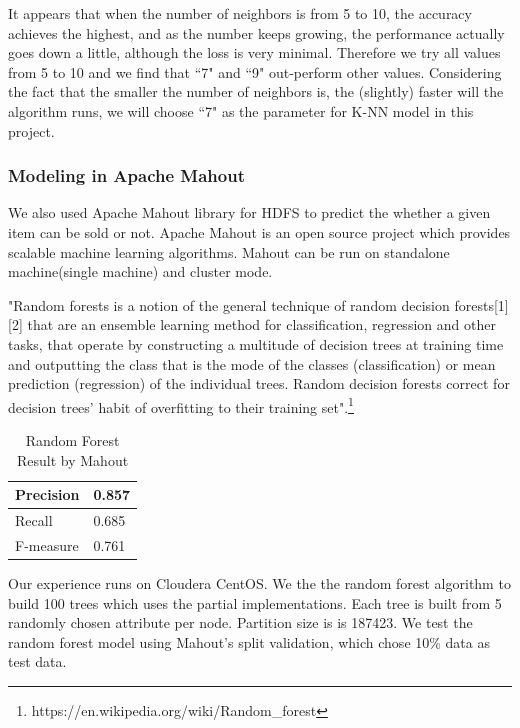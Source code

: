\documentclass[CEJM,PDF]{cej} %
\begin{document}
It appears that when the number of neighbors is from 5 to 10, the accuracy achieves the highest, and as the number keeps growing, the performance actually goes down a little, although the loss is very minimal. Therefore we try all values from 5 to 10 and we find that ``7" and ``9" out-perform other values. Considering the fact that the smaller the number of neighbors is, the (slightly) faster will the algorithm runs, we will choose ``7" as the parameter for K-NN model in this project.\\


\subsubsection{Modeling in Apache Mahout}
We also used Apache Mahout library for HDFS to predict the whether a given item can be sold or not. Apache Mahout is an open source project which provides scalable machine learning algorithms. Mahout can be run on standalone machine(single machine) and cluster mode. 

"Random forests is a notion of the general technique of random decision forests[1][2] that are an ensemble learning method for classification, regression and other tasks, that operate by constructing a multitude of decision trees at training time and outputting the class that is the mode of the classes (classification) or mean prediction (regression) of the individual trees. Random decision forests correct for decision trees' habit of overfitting to their training set".\footnote{https://en.wikipedia.org/wiki/Random\_forest}

\begin{table}[h]
\centering
\caption{Random Forest Result by Mahout}
\label{weka-model}
\begin{tabular}{@{}|l|l|@{}}
\toprule
\hline
Precision  & 0.857  \\ \midrule
\hline
Recall & 0.685  \\
\hline
F-measure  & 0.761 \\ \bottomrule
\hline
\end{tabular}
\end{table}

Our experience runs on Cloudera CentOS. We the the random forest algorithm to build 100 trees which uses the partial implementations. Each tree is built from 5 randomly chosen attribute per node. Partition size is is 187423. We test the random forest model using Mahout’s split validation, which chose 10\% data as test data. 
\end{document}
